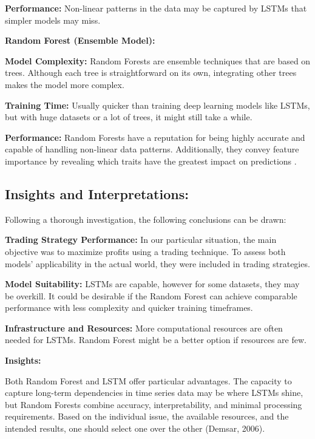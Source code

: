 \textbf{Performance:} Non-linear patterns in the data may be captured by LSTMs that simpler models may miss.

\textbf{Random Forest (Ensemble Model):}


\textbf{Model Complexity:} Random Forests are ensemble techniques that are based on trees. Although each tree is straightforward on its own, integrating other trees makes the model more complex.

\textbf{Training Time:} Usually quicker than training deep learning models like LSTMs, but with huge datasets or a lot of trees, it might still take a while.

\textbf{Performance:} Random Forests have a reputation for being highly accurate and capable of handling non-linear data patterns. Additionally, they convey feature importance by revealing which traits have the greatest impact on predictions \citep{breiman_random_2001}.

\subsection{Insights and Interpretations:}

Following a thorough investigation, the following conclusions can be drawn:


\textbf{Trading Strategy Performance:} In our particular situation, the main objective was to maximize profits using a trading technique. To assess both models' applicability in the actual world, they were included in trading strategies.


\textbf{Model Suitability:} LSTMs are capable, however for some datasets, they may be overkill. It could be desirable if the Random Forest can achieve comparable performance with less complexity and quicker training timeframes.


\textbf{Infrastructure and Resources:} More computational resources are often needed for LSTMs. Random Forest might be a better option if resources are few.

\textbf{Insights:}

Both Random Forest and LSTM offer particular advantages. The capacity to capture long-term dependencies in time series data may be where LSTMs shine, but Random Forests combine accuracy, interpretability, and minimal processing requirements. Based on the individual issue, the available resources, and the intended results, one should select one over the other (Demsar, 2006).

\medskip

